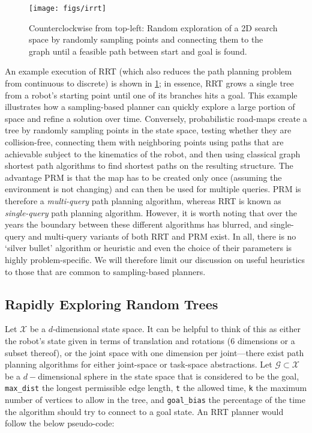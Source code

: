 \begin{figure}[!]
    \centering
    \texttt{[image: figs/irrt]}
    \caption{Counterclockwise from top-left: Random exploration of a 2D search space by randomly sampling points and connecting them to the graph until a feasible path between start and goal is found.\label{fig:rrt}}
\end{figure}

An example execution of RRT (which also reduces the path planning problem from continuous to discrete) is shown in \cref{fig:rrt}; in essence, RRT grows a single tree from a robot's starting point until one of its branches hits a goal.
This example illustrates how a sampling-based planner can quickly explore a large portion of space and refine a solution over time.
Conversely, probabilistic road-maps create a tree by randomly sampling points in the state space, testing whether they are collision-free, connecting them with neighboring points using paths that are achievable subject to the kinematics of the robot, and then using classical graph shortest path algorithms to find shortest paths on the resulting structure.
The advantage PRM is that the map has to be created only once (assuming the environment is not changing) and can then be used for multiple queries. PRM is therefore a \textsl{multi-query} path planning algorithm, whereas RRT is known as \textsl{single-query} path planning algorithm.
However, it is worth noting that over the years the boundary between these different algorithms has blurred, and single-query and multi-query variants of both RRT and PRM exist.
In all, there is no `silver bullet' algorithm or heuristic and even the choice of their parameters is highly problem-specific. We will therefore limit our discussion on useful heuristics to those that are common to sampling-based planners.

\subsection{Rapidly Exploring Random Trees}

Let $ \mathcal{X}$ be a $d$-dimensional state space. It can be helpful to think of this as either the robot's state given in terms of translation and rotations ($6$ dimensions or a subset thereof), or the joint space with one dimension per joint---there exist path planning algorithms for either joint-space or task-space abstractions. Let $ \mathcal{G} \subset \mathcal{X}$ be a $d-$dimensional sphere in the state space that is considered to be the goal, \texttt{max\_dist} the longest permissible edge length, \texttt{t} the allowed time, \texttt{k} the maximum number of vertices to allow in the tree, and \texttt{goal\_bias} the percentage of the time the algorithm should try to connect to a goal state. An RRT planner would follow the below pseudo-code:

